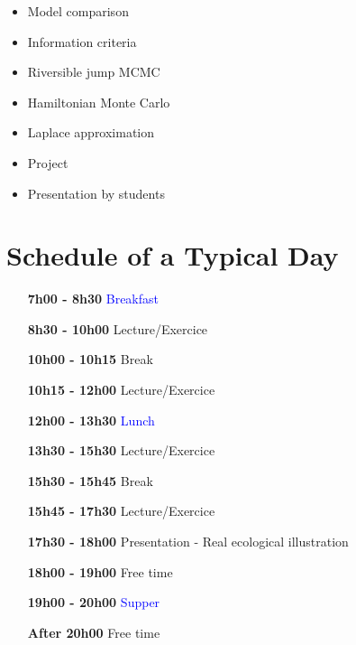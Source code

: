 \documentclass[12]{article}
\begin{document}
    \begin{itemize}[leftmargin=2.5cm]
      \item Model comparison
      \item Information criteria
      \item Riversible jump MCMC
      \item Hamiltonian Monte Carlo
      \item Laplace approximation
      \item Project
      \item Presentation by students
    \end{itemize}

    \section*{Schedule of a Typical Day}

    \begin{itemize}[leftmargin=2.5cm]
      \item[\bf 7h00 - 8h30] \textcolor{blue}{Breakfast}
      \item[\bf 8h30 - 10h00] Lecture/Exercice
      \item[\bf 10h00 - 10h15] \textcolor{green!50!black}{Break}
      \item[\bf 10h15 - 12h00] Lecture/Exercice
      \item[\bf 12h00 - 13h30] \textcolor{blue}{Lunch}
      \item[\bf 13h30 - 15h30] Lecture/Exercice
      \item[\bf 15h30 - 15h45] \textcolor{green!50!black}{Break}
      \item[\bf 15h45 - 17h30] Lecture/Exercice
      \item[\bf 17h30 - 18h00] Presentation - Real ecological illustration
      \item[\bf 18h00 - 19h00] \textcolor{green!50!black}{Free time}
      \item[\bf 19h00 - 20h00] \textcolor{blue}{Supper}
      \item[\bf After 20h00] \textcolor{green!50!black}{Free time}
    \end{itemize}
\end{document}
